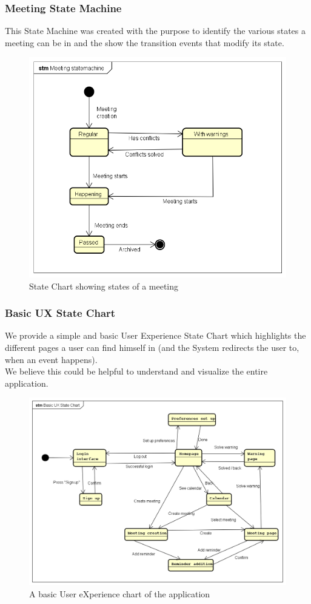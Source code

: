 
\subsubsection{Meeting State Machine}
This State Machine was created with the purpose to identify the various states a meeting can be in and the show the transition events that modify its state.

\begin{figure}[htp] 

\includegraphics[width=\textwidth]{statecharts/meetingstatemachine} 
\caption{State Chart showing states of a meeting} 
\label{fig:meetingstatemachine} 
\end{figure} 

\newpage
\subsubsection{Basic UX State Chart}
We provide a simple and basic User Experience State Chart which highlights the different pages a user can find himself in (and the System redirects the user to, when an event happens). 
\\We believe this could be helpful to understand and visualize the entire application.

\begin{figure}[htp] 

\includegraphics[width=\textwidth]{statecharts/basicux} 
\caption{A basic User eXperience chart of the application} 
\label{fig:ux} 
\end{figure}